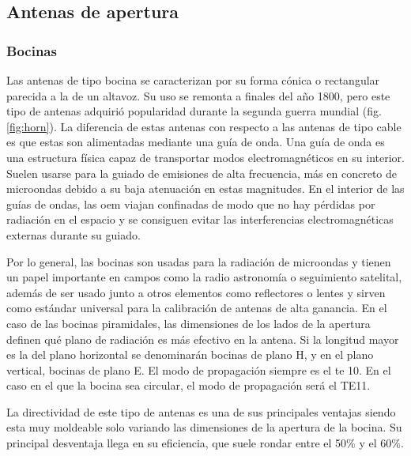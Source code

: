 \subsection{Antenas de apertura}
\subsubsection{Bocinas}

\par Las antenas de tipo bocina se caracterizan por su forma cónica o rectangular parecida a la de un altavoz. Su uso se remonta a finales del año 1800, pero este tipo de antenas adquirió popularidad durante la segunda guerra mundial (fig. \ref{fig:horn}). La diferencia de estas antenas con respecto a las antenas de tipo cable es que estas son alimentadas mediante una guía de onda. Una guía de onda es una estructura física capaz de transportar modos electromagnéticos en su interior. Suelen usarse para la guiado de emisiones de alta frecuencia, más en concreto de microondas debido a su baja atenuación en estas magnitudes. En el interior de las guías de ondas, las \gls{oem} viajan confinadas de modo que no hay pérdidas por radiación en el espacio y se consiguen evitar las interferencias electromagnéticas externas durante su guiado.
\\
\par Por lo general, las bocinas son usadas para la radiación de microondas y tienen un papel importante en campos como la radio astronomía o seguimiento satelital, además de ser usado junto a otros elementos como reflectores o lentes y sirven como estándar universal para la calibración de antenas de alta ganancia. En el caso de las bocinas piramidales, las dimensiones de los lados de la apertura definen qué plano de radiación es más efectivo en la antena. Si la longitud mayor es la del plano horizontal se denominarán bocinas de plano H, y en el plano vertical, bocinas de plano E. El modo de propagación siempre es el \gls{te} 10. En el caso en el que la bocina sea circular, el modo de propagación será el TE11.
\\
\par La directividad de este tipo de antenas es una de sus principales ventajas siendo esta muy moldeable solo variando las dimensiones de la apertura de la bocina. Su principal desventaja llega en su eficiencia, que suele rondar entre el 50\% y el 60\%.
